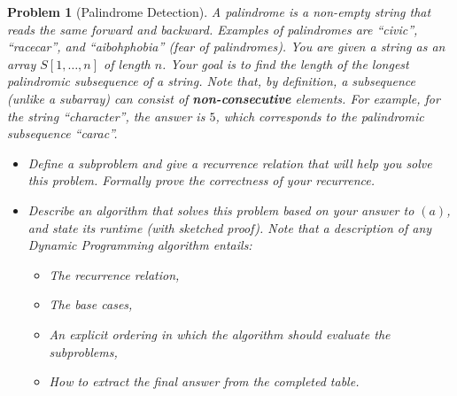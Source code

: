 \documentclass[10pt]{article}
\newtheorem{problem}{\sc\color{cit}Problem}
\begin{document}

\begin{problem}[Palindrome Detection]
A palindrome is a non-empty string that reads the same forward
and backward. Examples of palindromes are ``civic'',
``racecar'', and ``aibohphobia'' (fear of palindromes). You are given a string as an array $S[1, \ldots, n]$ of length $n$. Your goal is to find the length of the longest palindromic subsequence of a string. Note that, by definition, a subsequence (unlike a subarray) can consist of \textbf{non-consecutive} elements. For example, for the string ``character'', the answer is $5$, which corresponds to the palindromic subsequence ``carac''.

\begin{itemize}
    \item[(a)] Define a subproblem and give a recurrence relation that will help you solve this problem. Formally prove the correctness of your recurrence.
    \item[(b)] Describe an algorithm that solves this problem based on your answer to $(a)$, and state its runtime (with sketched proof). Note that a description of any Dynamic Programming algorithm entails:
    \begin{itemize}
        \item The recurrence relation,
        \item The base cases,
        \item An explicit ordering in which the algorithm should evaluate the subproblems,
        \item How to extract the final answer from the completed table.
    \end{itemize}
\end{itemize}

\end{problem}
\end{document}
